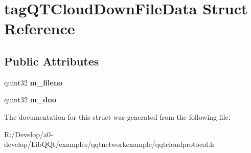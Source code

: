 \hypertarget{structtag_q_t_cloud_down_file_data}{}\section{tag\+Q\+T\+Cloud\+Down\+File\+Data Struct Reference}
\label{structtag_q_t_cloud_down_file_data}
\subsection*{Public Attributes}
\begin{DoxyCompactItemize}
\item 
\mbox{\label{structtag_q_t_cloud_down_file_data_aa33d77fe2e990bce192ec0c9bd658580}} 
quint32 {\bfseries m\+\_\+fileno}
\item 
\mbox{\label{structtag_q_t_cloud_down_file_data_a5b725b16aead1adc771a6fb9536a89f2}} 
quint32 {\bfseries m\+\_\+dno}
\end{DoxyCompactItemize}


The documentation for this struct was generated from the following file\+:\begin{DoxyCompactItemize}
\item 
R\+:/\+Develop/a0-\/develop/\+Lib\+Q\+Qt/examples/qqtnetworkexample/qqtcloudprotocol.\+h\end{DoxyCompactItemize}
